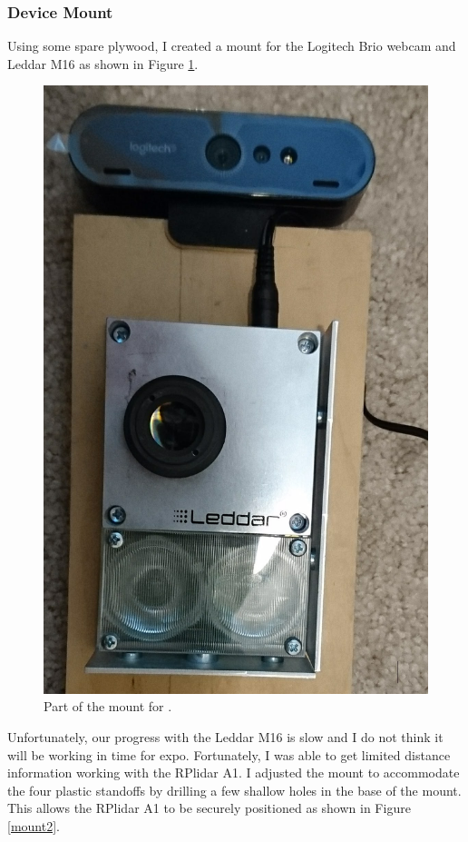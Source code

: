 \documentclass[onecolumn, draftclsnofoot,10pt, compsoc]{IEEEtran}
\makeatletter
\newcommand\captionof[1]{\def\@captype{#1}\caption}
\makeatother
\begin{document}
\begin{singlespace}
		\subsubsection{Device Mount}
			Using some spare plywood, I created a mount for the Logitech Brio webcam and Leddar M16 as shown in Figure \ref{mount1}.

			\begin{figure}[H]
				\includegraphics[scale=0.2]{mount1.PNG}
				\captionof{figure}{Part of the mount for .}
				\label{mount1}
			\end{figure}


			Unfortunately, our progress with the Leddar M16 is slow and I do not think it will be working in time for expo.
			Fortunately, I was able to get limited distance information working with the RPlidar A1.
			I adjusted the mount to accommodate the four plastic standoffs by drilling a few shallow holes in the base of the mount.
			This allows the RPlidar A1 to be securely positioned as shown in Figure \ref{mount2}.


\end{singlespace}
\end{document}
